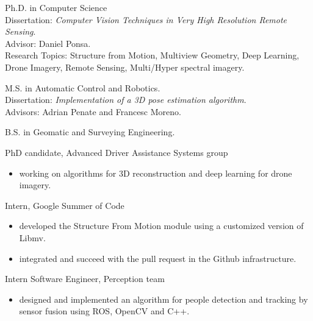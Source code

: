 \documentclass{article}
\begin{document}


\begin{llist}
\label{Education}

 
Ph.D. in Computer Science\\
Dissertation: \textit{Computer Vision Techniques in Very
High Resolution Remote Sensing}.\\
Advisor: Daniel Ponsa.\\
Research Topics: Structure from Motion, Multiview Geometry, Deep Learning, Drone Imagery, Remote Sensing, Multi/Hyper spectral imagery.

 
M.S. in Automatic Control and Robotics.\\
Dissertation: \textit{Implementation of a 3D pose estimation algorithm}.\\
Advisors: Adrian Penate and Francesc Moreno.

 
B.S. in Geomatic and Surveying Engineering.


\label{Work Experience}
\vspace{-0.33cm}

PhD candidate, Advanced Driver Assistance Systems group
\vspace{-0.33cm}
\begin{itemize}
 \item working on algorithms for 3D reconstruction and deep learning for drone imagery.
\end{itemize}

Intern, Google Summer of Code
\vspace{-0.33cm}
\begin{itemize}
 \item developed the Structure From Motion module using a customized version of Libmv.
 \item integrated and succeed with the pull request in the Github infrastructure.
\end{itemize}

Intern Software Engineer, Perception team
\vspace{-0.33cm}
\begin{itemize}
 \item designed and implemented an algorithm for people detection and tracking by sensor fusion using ROS, OpenCV and C++.
\end{itemize}


\end{llist}
\end{document}
